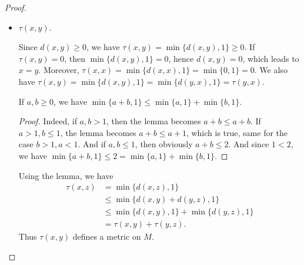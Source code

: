 \documentclass[12pt, a4paper]{article}
\theoremstyle{plain}
\begin{document}
\begin{proof}
\begin{itemize}
\begin{proof}
			If $1-ab\geq 0$, then
			\begin{align*}
			(*)&\Leftrightarrow& 1+c&\leq\frac{1+a+b+ab}{1-ab}\\
			&\Leftrightarrow& 1+c&\leq 1+\frac{a+b+2ab}{1-ab}\\
			&\Leftrightarrow& c&\leq \frac{a+b+2ab}{1-ab}\\
			&\Leftrightarrow& c-abc&\leq a+b+2ab.
			\end{align*}
			However, we have $c\leq a+b$ and $-abc\leq 0\leq 2ab$, thus the lemma is proved.
			\end{proof}
		Now let $a=d(x,z),b=d(x,y),c=d(y,z)$ in the lemma, we have $\sigma(x,z)\leq \sigma(x,y)+\sigma(y,z)$. Thus $\sigma$ defines a metric on $M$.
		\item $\tau(x,y)$.
		
		Since $d(x,y)\geq 0$, we have $\tau(x,y)=\min\{d(x,y),1\}\geq 0$. If $\tau(x,y)=0$, then $\min\{d(x,y),1\}=0$, hence $d(x,y)=0$, which leads to $x=y$. Moreover, $\tau(x,x)=\min\{d(x,x),1\}=\min\{0,1\}=0$. We also have $\tau(x,y)=\min\{d(x,y),1\}=\min\{d(y,x),1\}=\tau(y,x)$.
		\begin{lemma}
		If $a,b\geq 0$, we have $\min\{a+b,1\}\leq \min\{a,1\}+\min\{b,1\}$.
		\end{lemma}
			\begin{proof}
			Indeed, if $a,b>1$, then the lemma becomes $a+b\leq a+b$. If $a>1, b\leq 1$, the lemma becomes $a+b\leq a+1$, which is true, same for the case $b>1, a<1$. And if $a,b\leq 1$, then obviously $a+b\leq 2$. And since $1<2$, we have $\min\{a+b,1\}\leq 2=\min\{a,1\}+\min\{b,1\}$.
			\end{proof}
		Using the lemma, we have 
		\begin{align*}
		\tau(x,z)&=\min\{d(x,z),1\}\\
		&\leq \min\{d(x,y)+d(y,z),1\}\\
		&\leq\min\{d(x,y),1\}+\min\{d(y,z),1\}\\
		&=\tau(x,y)+\tau(y,z).
		\end{align*}
		Thus $\tau(x,y)$ defines a metric on $M$.
		\end{itemize}
		
	\end{proof}
\end{document}
